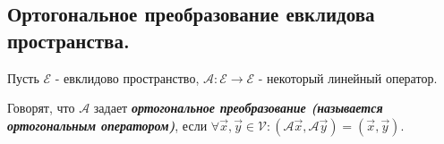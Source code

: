 \subsection{
    Ортогональное преобразование евклидова пространства.
}

Пусть $\mathcal{E}$ - евклидово пространство, $\mathscr{A} \colon \mathcal{E} \to \mathcal{E}$ - некоторый линейный оператор.

\begin{definition}
     Говорят, что $\mathscr{A}$ задает \textbf{\textit{ортогональное преобразование (называется ортогональным оператором)}}, если $\forall \vec{x}, \vec{y} \in \mathcal{V} \colon (\mathscr{A}\vec{x}, \mathscr{A}\vec{y}) = (\vec{x}, \vec{y})$.
\end{definition}
